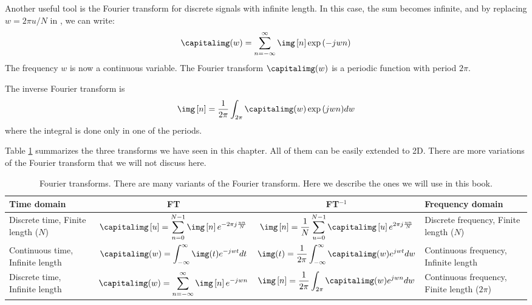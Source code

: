 Another useful tool is the Fourier transform for discrete signals with infinite length. In this case, the sum becomes infinite, and by replacing $w = 2 \pi u / N$ in \eqn{\ref{eq:fourier}}, we can write:
\begin{equation}
\capitalimg (w) = \sum_{n=-\infty}^{\infty} \img \left[n \right] \exp{(- j w n)}
\end{equation}
The frequency $w$ is now a continuous variable. The Fourier transform $\capitalimg (w)$ is a periodic function with period $2 \pi$. 

The inverse Fourier transform is
\begin{equation}
\img \left[n \right] = \frac{1}{2\pi} \int_{2 \pi} \capitalimg (w) \exp{(j w n)} d w
\end{equation}
where the integral is done only in one of the periods. 

Table \ref{table:tableFamilyFT} summarizes the three transforms we have seen in this chapter. All of them can be easily extended to 2D. There are more variations of the Fourier transform that we will not discuss here. 


\begin{table}[h]
\caption{Fourier transforms. There are many variants of the Fourier transform. Here we describe the ones we will use in this book.} %
\begin{center}
{
\renewcommand{\arraystretch}{2.5}
\begin{tabular}{| p{2.1cm} | c | c | p{2.1cm} |}
\hline
Time domain & FT & FT$^{-1}$ & Frequency domain \\
\hline \hline
Discrete time, Finite length ($N$) & 
$\displaystyle \capitalimg \left[u \right] = \sum_{n=0}^{N-1} \img \left[n \right] e^{-2 \pi j \frac{un}{N}}$
&
$\displaystyle \img \left[n \right] = \frac{1}{N} \sum_{u=0}^{N-1} \capitalimg \left[u \right] e^{2 \pi j \frac{un}{N} }$ &
Discrete frequency, Finite length ($N$) \\
\hline

Continuous time, Infinite length & 
$\displaystyle \capitalimg (w) = \int_{- \infty}^{\infty} \img (t) e^{- j w t} dt$
&
$\displaystyle \img (t) = \frac{1}{2\pi} \int_{- \infty}^{\infty} \capitalimg (w) e^{j w t} d w$ &
Continuous frequency, Infinite length \\
\hline

Discrete time, Infinite length & 
$\displaystyle \capitalimg (w) = \sum_{n=-\infty}^{\infty} \img \left[n \right] e^{- j w n}$
&
$\displaystyle \img \left[n \right] = \frac{1}{2\pi} \int_{2 \pi} \capitalimg (w) e^{j w n} d w$ &
Continuous frequency, Finite length ($2 \pi$) \\
\hline
\end{tabular}
}
\end{center}
\label{table:tableFamilyFT} 
\end{table}


